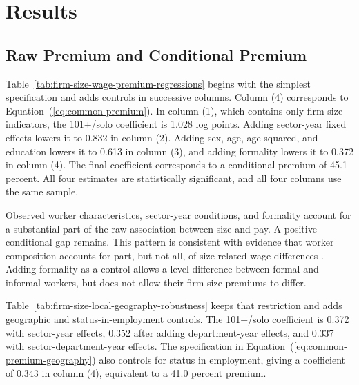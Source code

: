 \section{Results}

\subsection{Raw Premium and Conditional Premium}
\label{subsec:sequential-results}

Table~\ref{tab:firm-size-wage-premium-regressions} begins with the simplest
specification and adds controls in successive columns. Column (4) corresponds
to Equation~(\ref{eq:common-premium}). In column (1), which
contains only firm-size indicators, the 101+/solo coefficient is 1.028 log
points. Adding sector-year fixed effects lowers it to 0.832 in column (2).
Adding sex, age, age squared, and education lowers it to 0.613 in column (3),
and adding formality lowers it to 0.372 in column (4). The final coefficient
corresponds to a conditional premium of 45.1 percent. All four estimates are
statistically significant, and all four columns use the same sample.



Observed worker characteristics, sector-year conditions, and formality account
for a substantial part of the raw association between size and pay. A positive
conditional gap remains. This pattern is consistent with evidence that worker
composition accounts for part, but not all, of size-related wage differences
\citep{BrownMedoff1989,troske1999evidence,Schaffner1998,
SoderbomTealWambugu2005,reed2019large,iregui2012diferenciales}.
Adding formality as a control allows a level difference between formal
and informal workers, but does not allow their firm-size premiums to differ.

Table~\ref{tab:firm-size-local-geography-robustness} keeps that restriction
and adds geographic and status-in-employment controls. The 101+/solo
coefficient is 0.372 with sector-year effects, 0.352 after adding department-year
effects, and 0.337 with sector-department-year effects. The specification in
Equation~(\ref{eq:common-premium-geography}) also controls for status in employment, giving a coefficient of 0.343 in
column (4), equivalent to a 41.0 percent premium. %


\FloatBarrier

